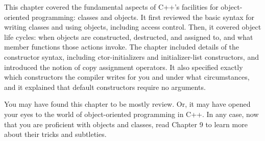 This chapter covered the fundamental aspects of C++’s facilities for object-oriented programming: classes and objects. It first reviewed the basic syntax for writing classes and using objects, including access control. Then, it covered object life cycles: when objects are constructed, destructed, and assigned to, and what member functions those actions invoke. The chapter included details of the constructor syntax, including ctor-initializers and initializer-list constructors, and introduced the notion of copy assignment operators. It also specified exactly which constructors the compiler writes for you and under what circumstances, and it explained that default constructors require no arguments.

You may have found this chapter to be mostly review. Or, it may have opened your eyes to the world of object-oriented programming in C++. In any case, now that you are proficient with objects and classes, read Chapter 9 to learn more about their tricks and subtleties.